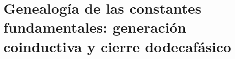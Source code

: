 



\part{Genealogía de las constantes fundamentales: generación coinductiva y cierre dodecafásico}







